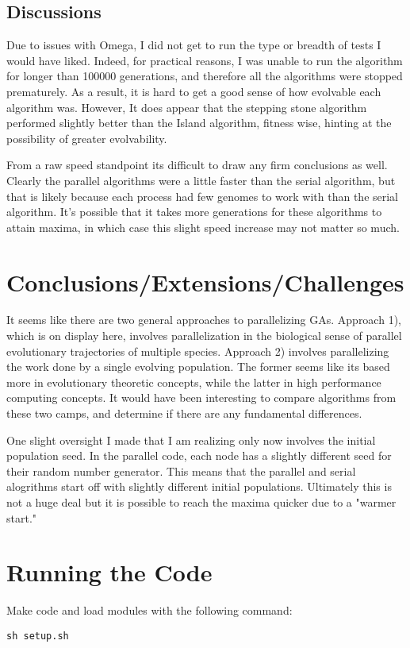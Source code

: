 \documentclass[11pt]{article}
\begin{document}
\subsection{Discussions}
\label{sec:org664de7b}

Due to issues with Omega, I did not get to run the type or breadth of tests I would have liked. Indeed, for practical reasons, I was unable to run the algorithm for longer than 100000 generations, and therefore all the algorithms were stopped prematurely. As a result, it is hard to get a good sense of how evolvable each algorithm was. However, It does appear that the stepping stone algorithm performed slightly better than the Island algorithm, fitness wise, hinting at the possibility of greater evolvability. 

From a raw speed standpoint its difficult to draw any firm conclusions as well. Clearly the parallel algorithms were a little faster than the serial algorithm, but that is likely because each process had few genomes to work with than the serial algorithm.  It's possible that it takes more generations for these algorithms to attain maxima, in which case this slight speed increase may not matter so much.

\section{Conclusions/Extensions/Challenges}
\label{sec:org0fccc3d}

It seems like there are two general approaches to parallelizing GAs. Approach 1), which is on display here, involves parallelization in the biological sense of parallel evolutionary trajectories of multiple species. Approach 2) involves parallelizing the work done by a single evolving population. The former seems like its based more in evolutionary theoretic concepts, while the latter in high performance computing concepts. It would have been interesting to compare algorithms from these two camps, and determine if there are any fundamental differences.  

One slight oversight I made that I am realizing only now involves the initial population seed. In the parallel code, each node has a slightly different seed for their random number generator. This means that the parallel and serial alogrithms start off with slightly different initial populations. Ultimately this is not a huge deal but it is possible to reach the maxima quicker due to a "warmer start."

\section{Running the Code}
\label{sec:org5221ff1}
Make code and load modules with the following command:
\begin{verbatim}
sh setup.sh
\end{verbatim}
\end{document}
